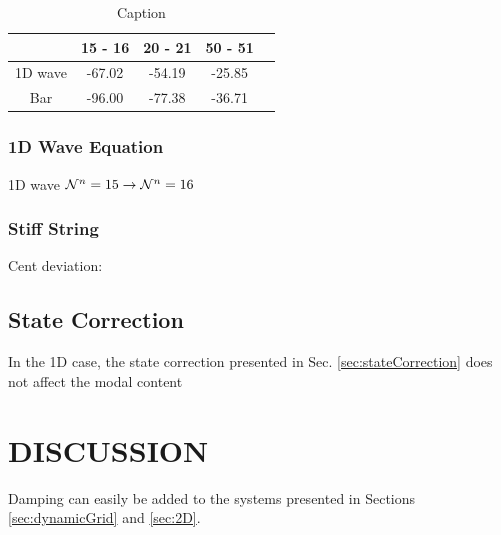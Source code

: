 \documentclass[fleqn]{jaes}
\begin{document}


\begin{table}[h]
    \centering
        \caption{Caption}

    \begin{tabular}{|c|c|c|c|c|}
        \hline & 15 - 16 & 20 - 21 & 50 - 51  \\\hline
        1D wave & -67.02 & -54.19 & -25.85 \\
        Bar & -96.00 & -77.38 & -36.71\\\hline
    \end{tabular}
    \label{tab:my_label}
\end{table}

\subsubsection{1D Wave Equation}

1D wave $\mathcal{N}^n = 15 \rightarrow \mathcal{N}^n = 16$ 

\subsubsection{Stiff String}

Cent deviation:

\subsection{State Correction}
In the 1D case, the state correction presented in Sec. \ref{sec:stateCorrection} does not affect the modal content 
\section{DISCUSSION}\label{sec:discussion}
Damping can easily be added to the systems presented in Sections \ref{sec:dynamicGrid} and \ref{sec:2D}.
\end{document}
